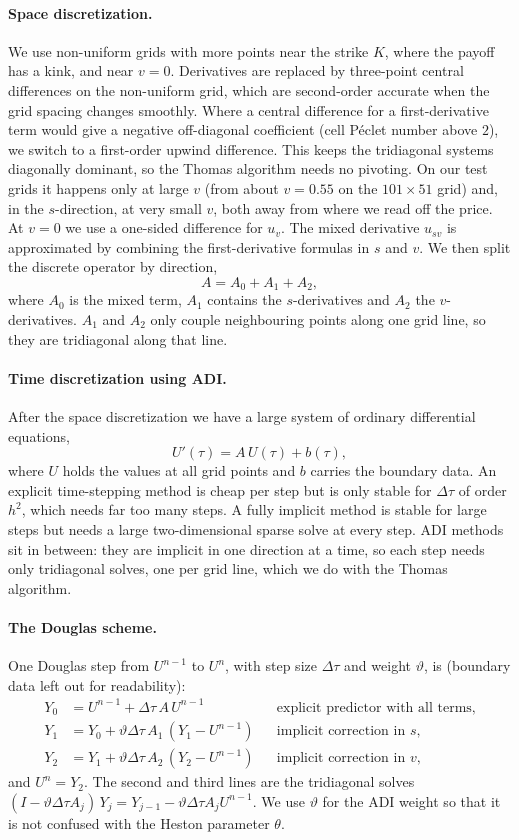 \documentclass[11pt]{article}
\begin{document}
\paragraph{Space discretization.}
We use non-uniform grids with more points near the strike $K$, where the payoff has a kink, and near $v=0$.
Derivatives are replaced by three-point central differences on the non-uniform grid, which are second-order
accurate when the grid spacing changes smoothly. Where a central difference for a first-derivative term would
give a negative off-diagonal coefficient (cell P\'eclet number above $2$), we switch to a first-order upwind
difference. This keeps the tridiagonal systems diagonally dominant, so the Thomas algorithm needs no pivoting.
On our test grids it happens only at large $v$ (from about $v=0.55$ on the $101\times51$ grid) and, in the
$s$-direction, at very small $v$, both away from where we read off the price. At $v=0$ we use a one-sided
difference for $u_v$. The mixed derivative $u_{sv}$ is approximated by combining
the first-derivative formulas in $s$ and $v$. We then split the discrete operator by direction,
\[
  A = A_0 + A_1 + A_2,
\]
where $A_0$ is the mixed term, $A_1$ contains the $s$-derivatives and $A_2$ the $v$-derivatives. $A_1$ and $A_2$
only couple neighbouring points along one grid line, so they are tridiagonal along that line.

\paragraph{Time discretization using ADI.}
After the space discretization we have a large system of ordinary differential equations,
\[
  U'(\tau) = A\,U(\tau) + b(\tau),
\]
where $U$ holds the values at all grid points and $b$ carries the boundary data. An explicit time-stepping
method is cheap per step but is only stable for $\Delta\tau$ of order $h^2$, which needs far too many steps.
A fully implicit method is stable for large steps but needs a large two-dimensional sparse solve at every step.
ADI methods sit in between: they are implicit in one direction at a time, so each step needs only tridiagonal
solves, one per grid line, which we do with the Thomas algorithm.

\paragraph{The Douglas scheme.}
One Douglas step from $U^{n-1}$ to $U^n$, with step size $\Delta\tau$ and weight $\vartheta$, is
(boundary data left out for readability):
\begin{align*}
  Y_0 &= U^{n-1} + \Delta\tau\,A\,U^{n-1} && \text{explicit predictor with all terms,}\\
  Y_1 &= Y_0 + \vartheta\Delta\tau\,A_1\,(Y_1 - U^{n-1}) && \text{implicit correction in } s,\\
  Y_2 &= Y_1 + \vartheta\Delta\tau\,A_2\,(Y_2 - U^{n-1}) && \text{implicit correction in } v,
\end{align*}
and $U^n=Y_2$. The second and third lines are the tridiagonal solves
$(I-\vartheta\Delta\tau A_j)\,Y_j = Y_{j-1} - \vartheta\Delta\tau A_j U^{n-1}$. We use $\vartheta$ for the ADI weight so that
it is not confused with the Heston parameter $\theta$.
\end{document}
